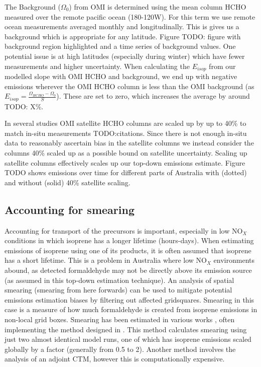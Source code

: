     The Background ($\Omega_0$) from OMI is determined using the mean column HCHO measured over the remote pacific ocean (180-120{\degr}W).
    For this term we use remote ocean measurements averaged monthly and longitudinally.
    This is gives us a background which is appropriate for any latitude.
    Figure TODO: figure with background region highlighted and a time series of background values.
    One potential issue is at high latitudes (especially during winter) which have fewer measurements and higher uncertainty.
    When calculating the $E_{isop}$ from our modelled slope with OMI HCHO and background, we end up with negative emissions wherever the OMI HCHO column is less than the OMI background (as $E_{isop} = \frac{\Omega_{HCHO} - \Omega_0}{S}$).
    These are set to zero, which increases the average by around TODO: X\%.
    
    In several studies OMI satellite HCHO columns are scaled up by up to 40\% to match in-situ measurements TODO:citations.
    Since there is not enough in-situ data to reasonably ascertain bias in the satellite columns we instead consider the columns 40\% scaled up as a possible bound on satellite uncertainty.
    Scaling up satellite columns effectively scales up our top-down emissions estimate. 
    Figure TODO shows emissions over time for different parts of Australia with (dotted) and without (solid) 40\% satellite scaling.
  
  \subsection{Accounting for smearing}
    \label{BioIsop:Method:Smearing}
    
    Accounting for transport of the precursors is important, especially in low NO$_X$ conditions in which isoprene has a longer lifetime (hours-days).
    When estimating emissions of isoprene using one of its products, it is often assumed that isoprene has a short lifetime.
    This is a problem in Australia where low NO$_X$ environments abound, as detected formaldehyde may not be directly above its emission source (as assumed in this top-down estimation technique).
    An analysis of spatial smearing (smearing from here forwards) can be used to mitigate potential emissions estimation biases by filtering out affected gridsquares.
    Smearing in this case is a measure of how much formaldehyde is created from isoprene emissions in non-local grid boxes.
    Smearing has been estimated in various works \parencite[eg.][]{Martin2003, Palmer2003, Millet2006, Stavrakou2009, Marais2012, Barkley2013, Zhu2014, Wolfe2016, Surl2018}, often implementing the method designed in \textcite{Palmer2003}.
    This method calculates smearing using just two almost identical model runs, one of which has isoprene emissions scaled globally by a factor (generally from 0.5 to 2).
    Another method \parencite[eg.][]{Stavrakou2009} involves the analysis of an adjoint CTM, however this is computationally expensive.
    
